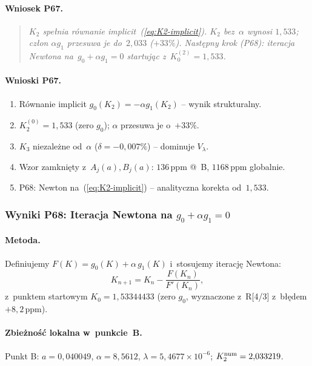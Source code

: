 \paragraph{Wniosek P67.}
\begin{quote}
\emph{$K_2$ spe\l{}nia r\'ownanie implicit~(\ref{eq:K2-implicit}).
$K_2$ bez~$\alpha$ wynosi $1{,}533$; cz\l{}on $\alpha g_1$ przesuwa je do~$2{,}033$ ($+33\%$).
Nast\k{e}pny krok (P68): iteracja Newtona na~$g_0+\alpha g_1=0$
startuj\k{a}c z~$K_0^{(2)}=1{,}533$.}
\end{quote}

\paragraph{Wnioski P67.}
\begin{enumerate}
  \item R\'ownanie implicit $g_0(K_2)=-\alpha g_1(K_2)$ -- wynik strukturalny.
  \item $K_2^{(0)} = 1{,}533$ (zero $g_0$); $\alpha$ przesuwa je o~$+33\%$.
  \item $K_3$ niezale\.zne od~$\alpha$ ($\delta=-0{,}007\%$) -- dominuje $V_\lambda$.
  \item Wzor zamkni\k{e}ty z~$A_j(a),B_j(a)$: $136\,\mathrm{ppm}$ @~B, $1168\,\mathrm{ppm}$ globalnie.
  \item P68: Newton na~(\ref{eq:K2-implicit}) -- analityczna korekta od~$1{,}533$.
\end{enumerate}

\subsubsection{Wyniki P68: Iteracja Newtona na $g_0+\alpha g_1=0$}
\label{app:F-P68}

\paragraph{Metoda.}
Definiujemy $F(K)=g_0(K)+\alpha\,g_1(K)$ i~stosujemy iteracj\k{e} Newtona:
\begin{equation}
  K_{n+1} = K_n - \frac{F(K_n)}{F'(K_n)},
  \label{eq:newton-F}
\end{equation}
z~punktem startowym $K_0=1{,}53344433$ (zero $g_0$, wyznaczone z~R[4/3] z~b\l{}\k{e}dem $+8{,}2\,\mathrm{ppm}$).

\paragraph{Zbie\.zno\'s\'c lokalna w~punkcie~B.}
Punkt B: $a=0{,}040049$, $\alpha=8{,}5612$, $\lambda=5{,}4677\times10^{-6}$;
$K_2^{\rm num}=2{,}033219$.

